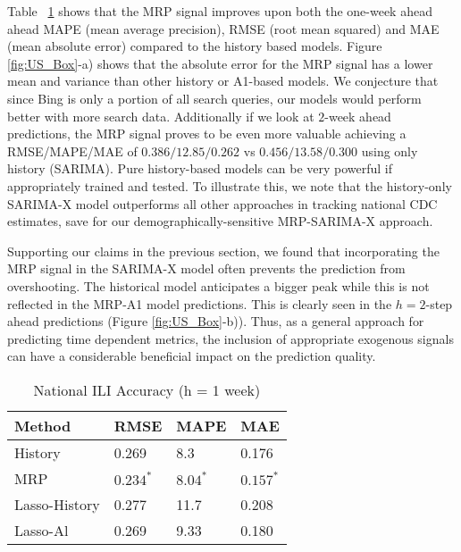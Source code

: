 \documentclass[fleqn,10pt]{wlscirep}
\begin{document}

Table ~\ref{mse-national} shows that the MRP signal improves upon both the one-week ahead ahead MAPE (mean average precision), RMSE (root mean squared)  and MAE (mean absolute error) compared to the history based models. Figure \ref{fig:US_Box}-a) shows that the absolute error for the MRP signal has a lower mean and variance than other history or A1-based models. We conjecture that since Bing is only a portion of all search queries, our models would perform better with more search data. Additionally if we look at $2$-week ahead predictions, the MRP signal proves to be even more valuable achieving a RMSE/MAPE/MAE of $0.386/12.85/0.262$ vs $0.456/13.58/0.300$ using only history (SARIMA). Pure history-based models can be very powerful if appropriately trained and tested. To illustrate this, we note that the history-only SARIMA-X model outperforms all other approaches in tracking national CDC estimates, save for our demographically-sensitive MRP-SARIMA-X approach.

Supporting our claims in the previous section, we found that incorporating the MRP signal in the SARIMA-X model often prevents the prediction from overshooting. The historical model anticipates a bigger peak while this is not reflected in the MRP-A1 model predictions. This is clearly seen in the $h=2$-step ahead predictions (Figure \ref{fig:US_Box}-b)). Thus, as a general approach for predicting time dependent metrics, the inclusion of appropriate exogenous signals can have a considerable beneficial impact on the prediction quality.

\begin{table}[tbp]
\centering
\caption{National ILI Accuracy (h = 1 week)}
\label{mse-national}
\begin{tabular}{|l|l|l|l|}
\hline
Method        & RMSE  & MAPE  & MAE \\ \hline
History       & 0.269 & 8.3  & 0.176\\ \hline
MRP           & $\mathbf{0.234^*}$ & $\mathbf{8.04^*}$ & $\mathbf{0.157^*}$\\ \hline
Lasso-History & 0.277 & 11.7 & 0.208\\ \hline
Lasso-Al      & 0.269 & 9.33 & 0.180\\ \hline
\end{tabular}
\end{table}
\end{document}
